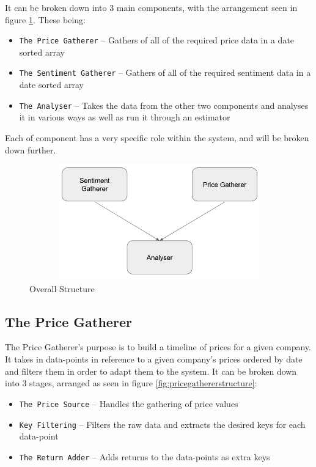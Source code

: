 It can be broken down into 3 main components, with the arrangement seen in figure \ref{fig:overallstructure}. These being:
\begin{itemize}
    \item \texttt{The Price Gatherer} -- Gathers of all of the required price data in a date sorted array
    \item \texttt{The Sentiment Gatherer} -- Gathers of all of the required sentiment data in a date sorted array
    \item \texttt{The Analyser} -- Takes the data from the other two components and analyses it in various ways as well as run it through an estimator
\end{itemize}
Each of component has a very specific role within the system, and will be broken down further.
\begin{figure}[h!]
    \centering
    \includegraphics[width=15cm,height=5cm,keepaspectratio]{design/OverallStructure.png}
    \caption{Overall Structure}
    \label{fig:overallstructure}
\end{figure}

\subsection{The Price Gatherer}

The Price Gatherer's purpose is to build a timeline of prices for a given company. It takes in data-points in reference to a given company's prices ordered by date and filters them in order to adapt them to the system. It can be broken down into 3 stages, arranged as seen in figure \ref{fig:pricegathererstructure}:
\begin{itemize}
    \item \texttt{The Price Source} -- Handles the gathering of price values
    \item \texttt{Key Filtering} -- Filters the raw data and extracts the desired keys for each data-point
    \item \texttt{The Return Adder} -- Adds returns to the data-points as extra keys
\end{itemize}

